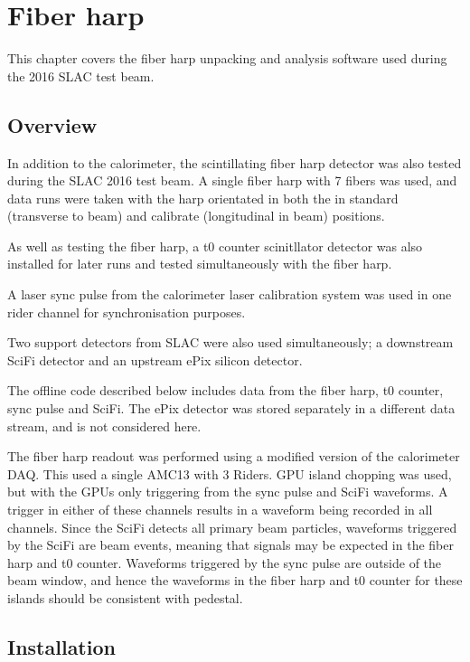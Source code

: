 \chapter{Fiber harp}
\label{chap:fiberharp}

This chapter covers the fiber harp unpacking and analysis software used during the 2016 SLAC test beam.

\section{Overview}

In addition to the calorimeter, the scintillating fiber harp detector was also tested during the SLAC 2016 test beam. A single fiber harp with 7 fibers was used, and data runs were taken with the harp orientated in both the in standard (transverse to beam) and calibrate (longitudinal in beam) positions. 

As well as testing the fiber harp, a t0 counter scinitllator detector was also installed for later runs and tested simultaneously with the fiber harp.

A laser sync pulse from the calorimeter laser calibration system was used in one rider channel for synchronisation purposes.

Two support detectors from SLAC were also used simultaneously; a downstream SciFi detector and an upstream ePix silicon detector. 

The offline code described below includes data from the fiber harp, t0 counter, sync pulse and SciFi. The ePix detector was stored separately in a different data stream, and is not considered here. 

The fiber harp readout was performed using a modified version of the calorimeter DAQ. This used a single AMC13 with 3 Riders. GPU island chopping was used, but with the GPUs only triggering from the sync pulse and SciFi waveforms. A trigger in either of these channels results in a waveform being recorded in all channels. Since the SciFi detects all primary beam particles, waveforms triggered by the SciFi are beam events, meaning that signals may be expected in the fiber harp and t0 counter. Waveforms triggered by the sync pulse are outside of the beam window, and hence the waveforms in the fiber harp and t0 counter for these islands should be consistent with pedestal.

\section{Installation}

